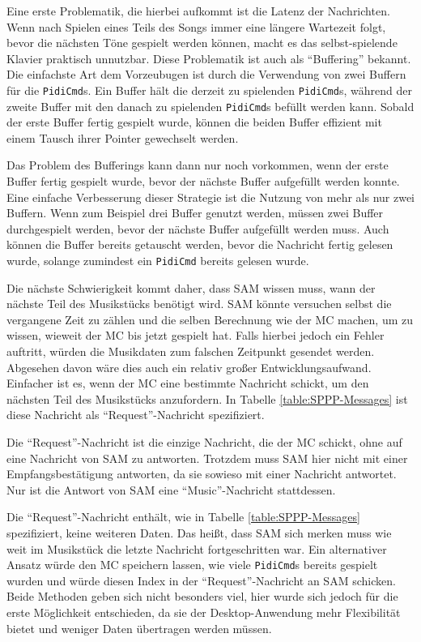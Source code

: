 Eine erste Problematik, die hierbei aufkommt ist die Latenz der Nachrichten.
Wenn nach Spielen eines Teils des Songs immer eine längere Wartezeit folgt, bevor die nächsten Töne gespielt werden können, macht es das selbst-spielende Klavier praktisch unnutzbar.
Diese Problematik ist auch als \enquote{Buffering} bekannt. %
Die einfachste Art dem Vorzeubugen ist durch die Verwendung von zwei Buffern für die \lstinline|PidiCmd|s.
Ein Buffer hält die derzeit zu spielenden \lstinline|PidiCmd|s, während der zweite Buffer mit den danach zu spielenden \lstinline|PidiCmd|s befüllt werden kann.
Sobald der erste Buffer fertig gespielt wurde, können die beiden Buffer effizient mit einem Tausch ihrer Pointer gewechselt werden.

Das Problem des Bufferings kann dann nur noch vorkommen, wenn der erste Buffer fertig gespielt wurde, bevor der nächste Buffer aufgefüllt werden konnte.
Eine einfache Verbesserung dieser Strategie ist die Nutzung von mehr als nur zwei Buffern.
Wenn zum Beispiel drei Buffer genutzt werden, müssen zwei Buffer durchgespielt werden, bevor der nächste Buffer aufgefüllt werden muss.
Auch können die Buffer bereits getauscht werden, bevor die Nachricht fertig gelesen wurde, solange zumindest ein \lstinline|PidiCmd| bereits gelesen wurde.

Die nächste Schwierigkeit kommt daher, dass \ac{SAM} wissen muss, wann der nächste Teil des Musikstücks benötigt wird.
\ac{SAM} könnte versuchen selbst die vergangene Zeit zu zählen und die selben Berechnung wie der \ac{MC} machen, um zu wissen, wieweit der \ac{MC} bis jetzt gespielt hat.
Falls hierbei jedoch ein Fehler auftritt, würden die Musikdaten zum falschen Zeitpunkt gesendet werden.
Abgesehen davon wäre dies auch ein relativ großer Entwicklungsaufwand.
Einfacher ist es, wenn der \ac{MC} eine bestimmte Nachricht schickt, um den nächsten Teil des Musikstücks anzufordern.
In Tabelle \ref{table:SPPP-Messages} ist diese Nachricht als \enquote{Request}-Nachricht spezifiziert.

Die \enquote{Request}-Nachricht ist die einzige Nachricht, die der \ac{MC} schickt, ohne auf eine Nachricht von \ac{SAM} zu antworten.
Trotzdem muss \ac{SAM} hier nicht mit einer Empfangsbestätigung antworten, da sie sowieso mit einer Nachricht antwortet.
Nur ist die Antwort von \ac{SAM} eine \enquote{Music}-Nachricht stattdessen.

Die \enquote{Request}-Nachricht enthält, wie in Tabelle \ref{table:SPPP-Messages} spezifiziert, keine weiteren Daten.
Das heißt, dass \ac{SAM} sich merken muss wie weit im Musikstück die letzte Nachricht fortgeschritten war.
Ein alternativer Ansatz würde den \ac{MC} speichern lassen, wie viele \lstinline{PidiCmd}s bereits gespielt wurden und würde diesen Index in der \enquote{Request}-Nachricht an \ac{SAM} schicken.
Beide Methoden geben sich nicht besonders viel, hier wurde sich jedoch für die erste Möglichkeit entschieden, da sie der Desktop-Anwendung mehr Flexibilität bietet und weniger Daten übertragen werden müssen.

